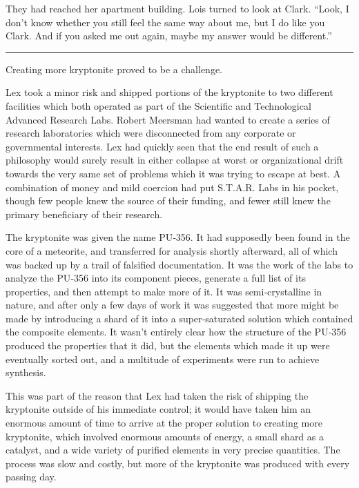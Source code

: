 \documentclass[ebook,12pt]{memoir}
\begin{document}
They had reached her apartment building. Lois turned to look at Clark.
``Look, I don't know whether you still feel the same way about me, but I
do like you Clark. And if you asked me out again, maybe my answer would
be different.''

\begin{center}\rule{0.5\linewidth}{\linethickness}\end{center}

Creating more kryptonite proved to be a challenge.

Lex took a minor risk and shipped portions of the kryptonite to two
different facilities which both operated as part of the Scientific and
Technological Advanced Research Labs. Robert Meersman had wanted to
create a series of research laboratories which were disconnected from
any corporate or governmental interests. Lex had quickly seen that the
end result of such a philosophy would surely result in either collapse
at worst or organizational drift towards the very same set of problems
which it was trying to escape at best. A combination of money and mild
coercion had put S.T.A.R. Labs in his pocket, though few people knew the
source of their funding, and fewer still knew the primary beneficiary of
their research.

The kryptonite was given the name PU‐356. It had supposedly been found
in the core of a meteorite, and transferred for analysis shortly
afterward, all of which was backed up by a trail of falsified
documentation. It was the work of the labs to analyze the PU‐356 into
its component pieces, generate a full list of its properties, and then
attempt to make more of it. It was semi‐crystalline in nature, and after
only a few days of work it was suggested that more might be made by
introducing a shard of it into a super‐saturated solution which
contained the composite elements. It wasn't entirely clear how the
structure of the PU‐356 produced the properties that it did, but the
elements which made it up were eventually sorted out, and a multitude of
experiments were run to achieve synthesis.

This was part of the reason that Lex had taken the risk of shipping the
kryptonite outside of his immediate control; it would have taken him an
enormous amount of time to arrive at the proper solution to creating
more kryptonite, which involved enormous amounts of energy, a small
shard as a catalyst, and a wide variety of purified elements in very
precise quantities. The process was slow and costly, but more of the
kryptonite was produced with every passing day.
\end{document}
